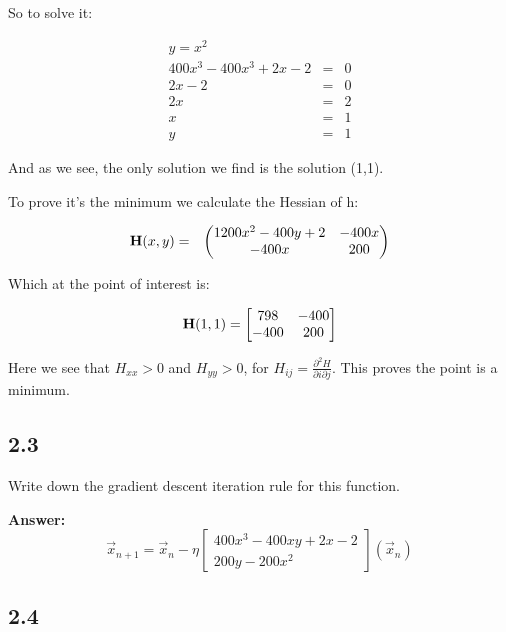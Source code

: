 \documentclass[a4paper]{article}
\begin{document}
So to solve it:

\begin{eqnarray}
y = x^2\\
400x^3 -400x^3 + 2x - 2 &=& 0\\
2x-2 &=& 0\\
2x &=& 2\\
x &=& 1\\
y &=& 1
\end{eqnarray}

And as we see, the only solution we find is the solution (1,1).

To prove it's the minimum we calculate the Hessian of h:

\begin{eqnarray}
\bold H(x,y) &=& \begin{pmatrix}
1200x^2 - 400y + 2 & -400x\\
-400x & 200
\end{pmatrix}
\end{eqnarray}

Which at the point of interest is:

\begin{equation}
\bold H(1,1) = \begin{bmatrix}
798 & -400\\
-400 & 200
\end{bmatrix}
\end{equation}

Here we see that $H_{xx} > 0$ and $H_{yy} > 0$, for $H_{ij} = \frac{\partial^2 H}{\partial i \partial j}$. This proves the point is a minimum.

\subsection*{2.3}

Write down the gradient descent iteration rule for this function.

\textbf{Answer:}\\


\begin{equation}
\vec x_{n+1} = \vec x_n - \eta \begin{bmatrix}
400x^3-400xy+2x-2\\
200y-200x^2
\end{bmatrix}(\vec x_n)
\end{equation}

\subsection*{2.4}
\end{document}
